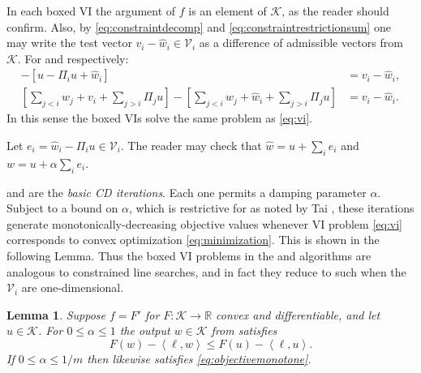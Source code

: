 \documentclass[letterpaper,final,12pt,reqno]{amsart}
\theoremstyle{cstyle}
\newtheorem{lemma}[theorem]{Lemma}
\theoremstyle{cstyle*}
\theoremstyle{dstyle}
\numberwithin{equation}{section}
\numberwithin{figure}{section}
\numberwithin{table}{section}
\numberwithin{theorem}{section}
\newcommand{\RR}{\mathbb{R}}
\newcommand{\cK}{\mathcal{K}}
\newcommand{\cV}{\mathcal{V}}
\newcommand{\ip}[2]{\left<#1,#2\right>}
\begin{document}
In each boxed VI the argument of $f$ is an element of $\cK$, as the reader should confirm.  Also, by \eqref{eq:constraintdecomp} and \eqref{eq:constraintrestrictionsum} one may write the test vector $v_i - \hat w_i \in \cV_i$ as a difference of admissible vectors from $\cK$.  For  and  respectively:
\begin{align}
[u - \Pi_i u + v_i] - [u - \Pi_i u + \hat w_i] &= v_i - \hat w_i, \label{eq:admissibledifferenceadd} \\
\left[\sum_{j<i} w_j + v_i + \sum_{j>i} \Pi_j u\right] - \left[\sum_{j<i} w_j + \hat w_i + \sum_{j>i} \Pi_j u\right] &= v_i - \hat w_i.  \label{eq:admissibledifferencemult}
\end{align}
In this sense the boxed VIs solve the same problem as \eqref{eq:vi}.

Let $e_i = \hat w_i - \Pi_i u \in \cV_i$.  The reader may check that $\hat w = u + \sum_{i} e_i$ and $w = u + \alpha \sum_i e_i$.

 and  are the \emph{basic CD iterations}.  Each one permits a damping parameter $\alpha$.  Subject to a bound on $\alpha$, which is restrictive for  as noted by Tai \cite{Tai2003}, these iterations generate monotonically-decreasing objective values whenever VI problem \eqref{eq:vi} corresponds to convex optimization \eqref{eq:minimization}.  This is shown in the following Lemma.  Thus the boxed VI problems in the  and  algorithms are analogous to constrained line searches, and in fact they reduce to such when the $\cV_i$ are one-dimensional.

\begin{lemma}  Suppose $f=F'$ for $F:\cK\to\RR$ convex and differentiable, and let $u\in\cK$.  For $0 \le \alpha \le 1$ the output $w \in \cK$ from  satisfies
\begin{equation}
F(w) - \ip{\ell}{w} \le F(u) - \ip{\ell}{u}.  \label{eq:objectivemonotone}
\end{equation}
If $0 \le \alpha \le 1/m$ then  likewise satisfies \eqref{eq:objectivemonotone}.
\end{lemma}
\end{document}
